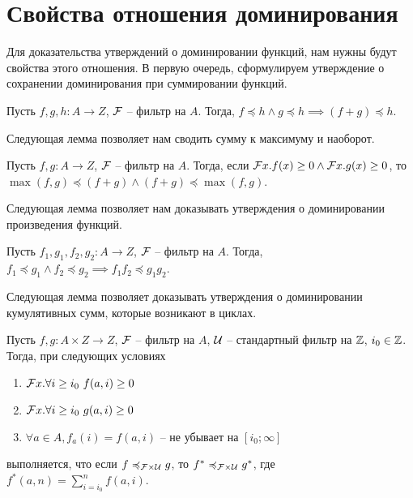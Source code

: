 \section{Свойства отношения доминирования}
Для доказательства утверждений о доминировании функций, нам нужны будут свойства этого отношения.
В первую очередь, сформулируем утверждение о сохранении доминирования при суммировании функций.
\begin{lemma}\label{lemma:sum}
	Пусть $f, g, h: A \to Z$, $\mathcal{F}$ -- фильтр на $A$. Тогда, $f \preccurlyeq h \land g \preccurlyeq h \implies (f + g) \preccurlyeq h$.
\end{lemma}
Следующая лемма позволяет нам сводить сумму к максимуму и наоборот.
\begin{lemma}\label{lemma:sum_max}
	Пусть $f, g: A \to Z$, $\mathcal{F}$ -- фильтр на $A$. Тогда, если $\mathcal{F} x. f(x) \geq 0 \land \mathcal{F} x. g(x) \geq 0$, то
	$\max(f, g) \preccurlyeq (f + g) \land (f+g) \preccurlyeq \max(f, g)$.
\end{lemma}
Следующая лемма позволяет нам доказывать утверждения о доминировании произведения функций.
\begin{lemma}\label{lemma:prod}
	Пусть $f_1, g_1, f_2, g_2: A \to Z$, $\mathcal{F}$ -- фильтр на $A$. Тогда,\\
	$f_1 \preccurlyeq g_1 \land f_2 \preccurlyeq g_2 \implies f_1f_2 \preccurlyeq g_1g_2$.
\end{lemma}
Следующая лемма позволяет доказывать утверждения о доминировании кумулятивных сумм, которые возникают в циклах.
\begin{lemma}\label{lemma:cumul}
	Пусть $f, g: A \times Z \to Z$, $\mathcal{F}$ -- фильтр на $A$, $\mathcal{U}$ -- стандартный фильтр на $\mathbb{Z}$, $i_0 \in \mathbb{Z}$. Тогда, при следующих условиях
	\begin{enumerate}
		\item $\mathcal{F} x. \forall i \geq i_0\ f(a, i) \geq 0$
		\item $\mathcal{F} x. \forall i \geq i_0\ g(a, i) \geq 0$
		\item $\forall a \in A, f_a(i) = f(a, i)$ -- не убывает на $[i_0;\infty]$
	\end{enumerate}
	выполняется, что если $f \preccurlyeq_{\mathcal{F} \times \mathcal{U}} g$, то $f^* \preccurlyeq_{\mathcal{F} \times \mathcal{U}} g^*$, где $f^*(a, n) = \sum_{i=i_{0}}^{n} f(a, i)$.
\end{lemma}
